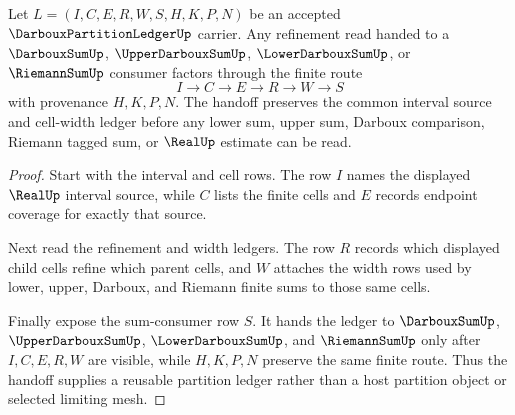 \begin{theorem}
\label{thm:darboux-partition-ledger-refinement-handoff}
Let $L=(I,C,E,R,W,S,H,K,P,N)$ be an accepted $\DarbouxPartitionLedgerUp$ carrier. Any refinement read handed to a $\DarbouxSumUp$, $\UpperDarbouxSumUp$, $\LowerDarbouxSumUp$, or $\RiemannSumUp$ consumer factors through the finite route
$$
I \to C \to E \to R \to W \to S
$$
with provenance $H,K,P,N$. The handoff preserves the common interval source and cell-width ledger before any lower sum, upper sum, Darboux comparison, Riemann tagged sum, or $\RealUp$ estimate can be read.
\end{theorem}
\begin{proof}
Start with the interval and cell rows. The row $I$ names the displayed $\RealUp$ interval source, while $C$ lists the finite cells and $E$ records endpoint coverage for exactly that source.

Next read the refinement and width ledgers. The row $R$ records which displayed child cells refine which parent cells, and $W$ attaches the width rows used by lower, upper, Darboux, and Riemann finite sums to those same cells.

Finally expose the sum-consumer row $S$. It hands the ledger to $\DarbouxSumUp$, $\UpperDarbouxSumUp$, $\LowerDarbouxSumUp$, and $\RiemannSumUp$ only after $I,C,E,R,W$ are visible, while $H,K,P,N$ preserve the same finite route. Thus the handoff supplies a reusable partition ledger rather than a host partition object or selected limiting mesh.
\end{proof}


\begin{closurestatus}{\DarbouxPartitionLedgerUp}
  \theoryclosure{\seedClosure}
  \formalstatus{\unformalizedV}
\end{closurestatus}
